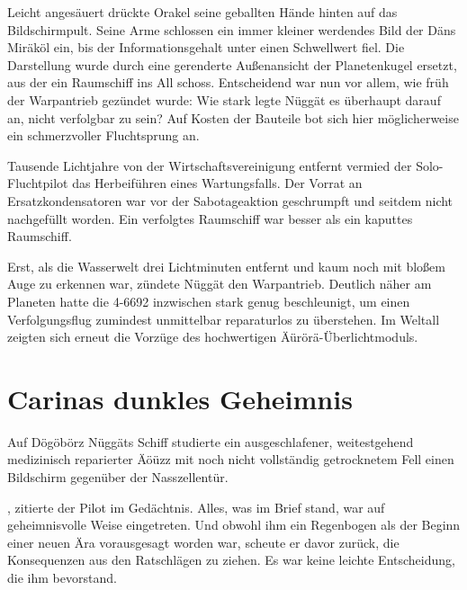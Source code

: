 Leicht angesäuert drückte Orakel seine geballten Hände hinten auf das Bildschirmpult. Seine Arme schlossen ein immer kleiner werdendes Bild der Däns Miräköl ein, bis der Informationsgehalt unter einen Schwellwert fiel. Die Darstellung wurde durch eine gerenderte Außenansicht der Planetenkugel ersetzt, aus der ein Raumschiff ins All schoss. Entscheidend war nun vor allem, wie früh der Warpantrieb gezündet wurde: Wie stark legte Nüggät es überhaupt darauf an, nicht verfolgbar zu sein? Auf Kosten der Bauteile bot sich hier möglicherweise ein schmerzvoller Fluchtsprung an.

Tausende Lichtjahre von der Wirtschaftsvereinigung entfernt vermied der Solo-Fluchtpilot das Herbeiführen eines Wartungsfalls. Der Vorrat an Ersatzkondensatoren war vor der Sabotageaktion geschrumpft und seitdem nicht nachgefüllt worden. Ein verfolgtes Raumschiff war besser als ein kaputtes Raumschiff.

Erst, als die Wasserwelt drei Lichtminuten entfernt und kaum noch mit bloßem Auge zu erkennen war, zündete Nüggät den Warpantrieb. Deutlich näher am Planeten hatte die 4-6692 inzwischen stark genug beschleunigt, um einen Verfolgungsflug zumindest unmittelbar reparaturlos zu überstehen. Im Weltall zeigten sich erneut die Vorzüge des hochwertigen Äürörä-Überlichtmoduls.


\chapter{Carinas dunkles Geheimnis}

Auf Dögöbörz Nüggäts Schiff studierte ein ausgeschlafener, weitestgehend medizinisch reparierter Äöüzz mit noch nicht vollständig getrocknetem Fell einen Bildschirm gegenüber der Nasszellentür.

, zitierte der Pilot im Gedächtnis. Alles, was im Brief stand, war auf geheimnisvolle Weise eingetreten. Und obwohl ihm ein Regenbogen als der Beginn einer neuen Ära vorausgesagt worden war, scheute er davor zurück, die Konsequenzen aus den Ratschlägen zu ziehen. Es war keine leichte Entscheidung, die ihm bevorstand.

